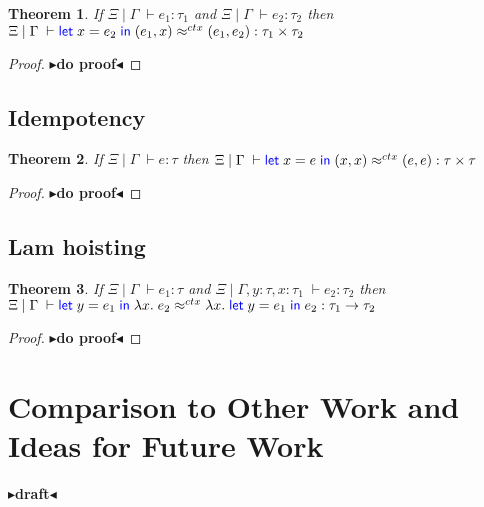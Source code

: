 \documentclass[twoside,11pt,openright]{report}
\newtheorem{theorem}{Theorem}
\theoremstyle{definition}
\newcommand{\var}{x}
\newcommand{\varB}{y}
\newcommand{\expr}{e}
\newcommand{\Tprod}[2]{#1 \times #2}
\newcommand{\Tfunc}[2]{#1 \rightarrow #2}
\newcommand{\typ}{\tau}
\newcommand{\venv}{\Gamma}
\newcommand{\tenv}{\Xi}
\newcommand{\jdg}[4]{#1 \; | \; #2 \; \vdash #3 : #4}
\newcommand{\jdgRel}[6]{#1 \; | \; #2 \; \vdash #3 \approx^{#4} #5 : #6}
\newcommand{\ctxRel}[5]{\jdgRel{#1}{#2}{#3}{ctx}{#4}{#5}}
\newcommand{\todo}[1]{{\color[rgb]{.5,0,0}\textbf{$\blacktriangleright$#1$\blacktriangleleft$}}}
\begin{document}
\begin{theorem}
  If $\jdg{\tenv}{\venv}{\expr_1}{\typ_1}$ and $\jdg{\tenv}{\venv}{\expr_2}{\typ_2}$ then\\
  $\ctxRel{\tenv}{\venv}{\Let \var = \expr_2 in (\expr_1, \var)}{(\expr_1, \expr_2)}{\Tprod{\typ_1}{\typ_2}}$
\end{theorem}
\begin{proof}
  \todo{do proof}
\end{proof}


\section{Idempotency}

\begin{theorem}
  If $\jdg{\tenv}{\venv}{\expr}{\typ}$ then $\ctxRel{\tenv}{\venv}{\Let \var = \expr in (\var, \var)}{(\expr, \expr)}{\Tprod{\typ}{\typ}}$
\end{theorem}
\begin{proof}
  \todo{do proof}
\end{proof}


\section{Lam hoisting}

\begin{theorem}
  If $\jdg{\tenv}{\venv}{\expr_1}{\typ}$ and $\jdg{\tenv}{\venv, \varB : \typ, \var : \typ_1}{\expr_2}{\typ_2}$ then\\
  $\ctxRel{\tenv}{\venv}{\Let \varB = \expr_1 in \fun \var . \expr_2}{\fun \var . \Let \varB = \expr_1 in \expr_2}{\Tfunc{\typ_1}{\typ_2}}$
\end{theorem}
\begin{proof}
  \todo{do proof}
\end{proof}



\chapter{Comparison to Other Work and Ideas for Future Work}
\label{ch:COWFW}

\todo{draft}

\end{document}
